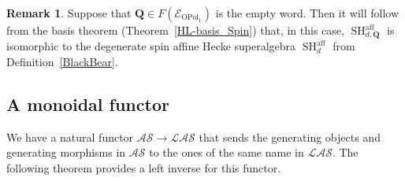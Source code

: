 \documentclass[11pt]{amsart}
\theoremstyle{definition}
\newtheorem{rmk}[theo]{Remark}
\numberwithin{equation}{section}
\begin{document}
\begin{rmk} 
Suppose that $ \mathbf{Q} \in F(\mathcal{E}_{\operatorname{OPol}_{1}}) $ is the empty word. Then it will follow from the basis theorem (Theorem~\ref{HL-basis_Spin}) that, in this case, $ \operatorname{SH}^{\operatorname{aff}}_{d,\mathbf{Q}} $ is isomorphic to the degenerate spin affine Hecke superalgebra $ \operatorname{SH}^{\operatorname{aff}}_{d} $ from Definition~\ref{BlackBear}.
\end{rmk}


\subsection{A monoidal functor}

We have a natural functor $ \mathcal{AS} \rightarrow \mathcal{LAS} $ that sends the generating objects and generating morphisms in $ \mathcal{AS} $ to the ones of the same name in $ \mathcal{LAS} $. The following theorem provides a left inverse for this functor.
\end{document}
